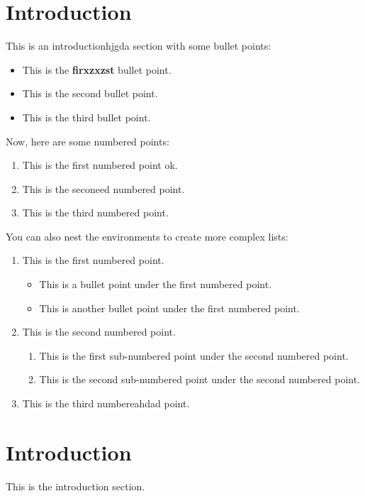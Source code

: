 \documentclass{article}
\begin{document}
\begin{multicols}{2}
	\section{Introduction}

	This is an introductionhjgda section with some bullet points:

	\begin{itemize}
		\item This is the \large\textbf{firxzxzst} bullet point.
		\item This is the second bullet point.
		\item This is the third bullet point.
	\end{itemize}
	Now, here are some numbered points:
	\begin{enumerate}
		\item This is the first numbered point ok.
		\item This is the seconeed numbered point.
		\item This is the third numbered point.
	\end{enumerate}
	You can also nest the environments to create more complex lists:
	\begin{enumerate}
		\item This is the first numbered point.
		      \begin{itemize}
			      \item This is a bullet point under the first numbered point.
			      \item This is another bullet point under the first numbered point.
		      \end{itemize}
		\item This is the second numbered point.
		      \begin{enumerate}
			      \item This is the first sub-numbered point under the second numbered point.
			      \item This is the second sub-numbered point under the second numbered point.
		      \end{enumerate}
		\item This is the third numbereahdad point.
	\end{enumerate}
	\section{Introduction}
	This is the introduction section.


\end{multicols}
\end{document}
